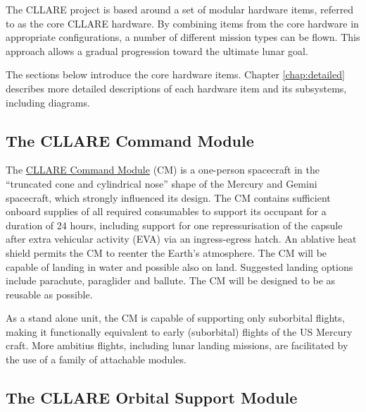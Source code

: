 \documentclass{report}
\begin{document}
The CLLARE project is based around a set of modular hardware items, referred to as the core CLLARE hardware.  By combining items from the core hardware in appropriate configurations, a number of different mission types can be flown.  This approach allows a gradual progression toward the ultimate lunar goal.

The sections below introduce the core hardware items.  Chapter \ref{chap:detailed} describes more detailed descriptions of each hardware item and its subsystems, including diagrams.

\subsection{The CLLARE Command Module}

The \href{http://cstart.org/wiki/CLLARE_Command_Module}{CLLARE Command Module} (CM) is a one-person spacecraft in the ``truncated cone and cylindrical nose'' shape of the Mercury and Gemini spacecraft, which strongly influenced its design.  The CM contains sufficient onboard supplies of all required consumables to support its occupant for a duration of 24 hours, including support for one repressurisation of the capsule after extra vehicular activity (EVA) via an ingress-egress hatch.  An ablative heat shield permits the CM to reenter the Earth's atmosphere.  The CM will be capable of landing in water and possible also on land.  Suggested landing options include parachute, paraglider and ballute.  The CM will be designed to be as reusable as possible.

As a stand alone unit, the CM is capable of supporting only suborbital flights, making it functionally equivalent to early (suborbital) flights of the US Mercury craft.  More ambitius flights, including lunar landing missions, are facilitated by the use of a family of attachable modules.

\subsection{The CLLARE Orbital Support Module}
\end{document}
